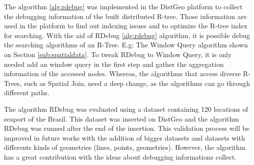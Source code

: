 The algorithm \ref{alg:rdebug} was implemented in the DistGeo platform to collect the debugging information of the built distributed R-tree. 
Those information are used in the platform to find out indexing issues and to optimize the R-tree index for searching. With the aid of RDebug \ref{alg:rdebug} algorithm, it is possible debug the searching algorithms of an R-Tree. 
E.g: The Window Query algorithm shown on Section \ref{sub:spatialdata}. To tweak RDebug to Window Query, it is only needed add an window query in the first step and gather the aggregation information of the accessed nodes. 
Whereas, the algorithms that access diverse R-Trees, such as Spatial Join, need a deep change, as the algorithms can go through different paths.

The algorithm RDebug was evaluated using a dataset containing 120 locations of seaport of the Brasil. 
This dataset was inserted on DistGeo and the algorithm RDebug was runned after the end of the insertion. 
This validation process will be improved in future works with the addition of bigger datasets and datasets with differents kinds of geometries (lines, points, geometries).
However, the algorithm has a great contribution with the ideas about debugging informations collect.

